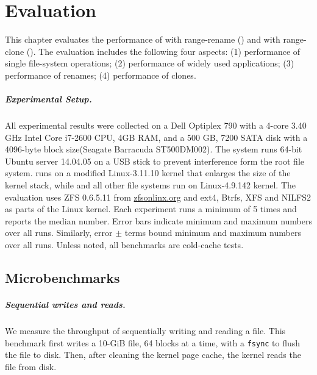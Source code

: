 \chapter{Evaluation}
\label{chap:eval}

This chapter evaluates the performance of \betrfs with
range-rename (\betrfsFour) and \betrfs with range-clone (\betrfsFive).
The evaluation includes the following four aspects:
(1) performance of single file-system operations;
(2) performance of widely used applications;
(3) performance of renames;
(4) performance of clones.

\paragraph{Experimental Setup.}

All experimental results were collected on
a Dell Optiplex 790 with a 4-core 3.40 GHz Intel Core i7-2600 CPU,
4GB RAM,
and a 500 GB, 7200 SATA disk with a 4096-byte block size(Seagate Barracuda ST500DM002).
The system runs 64-bit Ubuntu server 14.04.05 on a USB stick to prevent
interference form the root file system.
\betrfsFour runs on a modified Linux-3.11.10 kernel that enlarges the size of the kernel stack,
while \betrfsFive and all other file systems run on Linux-4.9.142 kernel.
The evaluation uses ZFS 0.6.5.11 from \url{zfsonlinx.org} and
ext4, Btrfs, XFS and NILFS2 as parts of the Linux kernel.
Each experiment runs a minimum of 5 times and reports the median number.
Error bars indicate minimum and maximum numbers over all runs.
Similarly, error $\pm$ terms bound minimum and maximum numbers over all runs.
Unless noted, all benchmarks are cold-cache tests.

\section{Microbenchmarks}

\paragraph{Sequential writes and reads.}

We measure the throughput of sequentially writing and reading a file.
This benchmark first writes a 10-GiB file, 64 blocks at a time, with a
\texttt{fsync} to flush the file to disk.
Then, after cleaning the kernel page cache, the kernel reads the file from disk.

\newcommand{\addSeqPlot}[1]{
    \addplot[
        discard if not={fs}{#1},
        fill=\pgfkeysvalueof{/fs-colors/#1},
        nodes near coords=\pgfkeysvalueof{/fs-names/#1},
    ]
    plot[
        error bars/.cd,
        y dir=both, y explicit,
    ]
    table[
        x=op,
        y=median,
        y error plus expr=\thisrow{max}-\thisrow{median},
        y error minus expr=\thisrow{median}-\thisrow{min},
    ]
    {./data/seq_io.csv};
}

